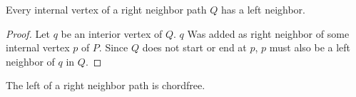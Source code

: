     \begin{lemma}
      \label{lm:right:leftNeighborsOfTheRightNeighborPath}
      Every internal vertex of a right neighbor path $Q$ has a left neighbor.
    \end{lemma}
    \begin{proof}
      Let $q$ be an interior vertex of $Q$.
      $q$ Was added as right neighbor of some internal vertex $p$ of $P$.
      Since $Q$ does not start or end at $p$, $p$ must also be a left neighbor of $q$ in $Q$.
    \end{proof}

    \begin{lemma}
      \label{lm:right:neighbourwalkChordFree}
      The left of a right neighbor path is chordfree.
    \end{lemma}
